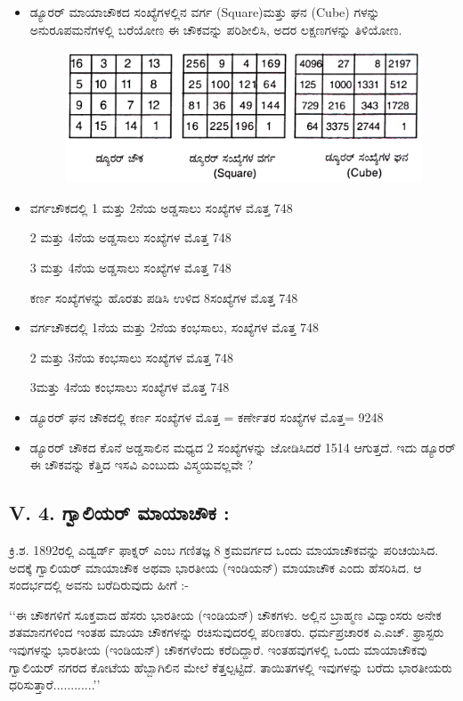 \begin{itemize}
	\item ಡ್ಯೂರರ್ ಮಾಯಾಚೌಕದ ಸಂಖ್ಯೆಗಳಲ್ಲಿನ ವರ್ಗ (Square)ಮತ್ತು ಘನ (Cube) ಗಳನ್ನು ಅನುರೂಪಮನೆಗಳಲ್ಲಿ ಬರೆಯೋಣ
	ಈ ಚೌಕವನ್ನು ಪರಿಶೀಲಿಸಿ, ಅದರ ಲಕ್ಷಣಗಳನ್ನು ತಿಳಿಯೋಣ.
	\begin{figure}[H]
	\includegraphics{src/figures/chap4/fig4-20.jpg}
	\end{figure}

	\item ವರ್ಗಚೌಕದಲ್ಲಿ 1 ಮತ್ತು 2ನೆಯ ಅಡ್ಡಸಾಲು ಸಂಖ್ಯೆಗಳ ಮೊತ್ತ 748

	2 ಮತ್ತು 4ನೆಯ ಅಡ್ಡಸಾಲು ಸಂಖ್ಯೆಗಳ ಮೊತ್ತ 748

	3 ಮತ್ತು 4ನೆಯ ಅಡ್ಡಸಾಲು ಸಂಖ್ಯೆಗಳ ಮೊತ್ತ 748

	ಕರ್ಣ ಸಂಖ್ಯೆಗಳನ್ನು ಹೊರತು ಪಡಿಸಿ ಉಳಿದ 8ಸಂಖ್ಯೆಗಳ ಮೊತ್ತ 748
	\item ವರ್ಗಚೌಕದಲ್ಲಿ 1ನೆಯ ಮತ್ತು 2ನೆಯ ಕಂಭಸಾಲು, ಸಂಖ್ಯೆಗಳ ಮೊತ್ತ 748

	2 ಮತ್ತು 3ನೆಯ ಕಂಭಸಾಲು ಸಂಖ್ಯೆಗಳ ಮೊತ್ತ 748

	3ಮತ್ತು 4ನೆಯ ಕಂಭಸಾಲು ಸಂಖ್ಯೆಗಳ ಮೊತ್ತ 748
	\item ಡ್ಯೂರರ್ ಘನ ಚೌಕದಲ್ಲಿ ಕರ್ಣ ಸಂಖ್ಯೆಗಳ ಮೊತ್ತ = ಕರ್ಣೇತರ ಸಂಖ್ಯೆಗಳ ಮೊತ್ತ= 9248

	\item ಡ್ಯೂರರ್ ಚೌಕದ ಕೊನೆ ಅಡ್ಡಸಾಲಿನ ಮಧ್ಯದ 2 ಸಂಖ್ಯೆಗಳನ್ನು ಜೋಡಿಸಿದರೆ 1514 ಆಗುತ್ತದೆ. ಇದು ಡ್ಯೂರರ್ ಈ ಚೌಕವನ್ನು ಕೆತ್ತಿದ ಇಸವಿ ಎಂಬುದು ವಿಸ್ಮಯವಲ್ಲವೇ ?
\end{itemize}

\subsection*{V. 4. ಗ್ವಾಲಿಯರ್ ಮಾಯಾಚೌಕ :}

ಕ್ರಿ.ಶ. 1892ರಲ್ಲಿ ಎಡ್ವರ್ಡ್ ಫಾಕ್ನರ್ ಎಂಬ ಗಣಿತಜ್ಞ 8 ಕ್ರಮವರ್ಗದ ಒಂದು ಮಾಯಾಚೌಕವನ್ನು ಪರಿಚಯಿಸಿದ. ಅದಕ್ಕೆ ಗ್ವಾಲಿಯರ್ ಮಾಯಾಚೌಕ ಅಥವಾ ಭಾರತೀಯ (ಇಂಡಿಯನ್) ಮಾಯಾಚೌಕ ಎಂದು ಹೆಸರಿಸಿದ. ಆ ಸಂದರ್ಭದಲ್ಲಿ ಅವನು ಬರೆದಿರುವುದು ಹೀಗೆ :-

‘‘ಈ ಚೌಕಗಳಿಗೆ ಸೂಕ್ತವಾದ ಹೆಸರು ಭಾರತೀಯ (ಇಂಡಿಯನ್) ಚೌಕಗಳು. ಅಲ್ಲಿನ ಬ್ರಾಹ್ಮಣ ವಿದ್ವಾಂಸರು ಅನೇಕ ಶತಮಾನಗಳಿಂದ ಇಂತಹ ಮಾಯಾ ಚೌಕಗಳನ್ನು ರಚಿಸುವುದರಲ್ಲಿ ಪರಿಣತರು. ಧರ್ಮಪ್ರಚಾರಕ ಎ.ಎಚ್. ಫ್ರಾಸ್ಟರು ಇವುಗಳನ್ನು ಭಾರತೀಯ (ಇಂಡಿಯನ್) ಚೌಕಗಳೆಂದು ಕರೆದಿದ್ದಾರೆ. ಇಂತಹವುಗಳಲ್ಲಿ ಒಂದು ಮಾಯಾಚೌಕವು ಗ್ವಾಲಿಯರ್ ನಗರದ ಕೋಟೆಯ ಹೆಬ್ಬಾಗಿಲಿನ ಮೇಲೆ ಕೆತ್ತಲ್ಪಟ್ಟಿದೆ. ತಾಯಿತಗಳಲ್ಲಿ ಇವುಗಳನ್ನು ಬರೆದು ಭಾರತೀಯರು ಧರಿಸುತ್ತಾರೆ............’’

